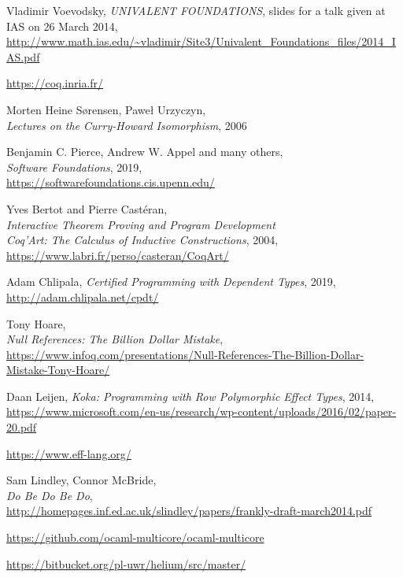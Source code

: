 \documentclass[declaration,inz,english,shortabstract]{iithesis}
\begin{document}
\begin{thebibliography}{1}
        Vladimir Voevodsky,
        \textit{UNIVALENT FOUNDATIONS},
        slides for a talk given at IAS on 26 March 2014, \\
        \url{http://www.math.ias.edu/~vladimir/Site3/Univalent_Foundations_files/2014_IAS.pdf}

        \url{https://coq.inria.fr/}

        Morten Heine Sørensen, Paweł Urzyczyn, \\
        \textit{Lectures on the Curry-Howard Isomorphism}, 2006
    
        Benjamin C. Pierce, Andrew W. Appel and many others, \\
        \textit{Software Foundations}, 2019, \\
        \url{https://softwarefoundations.cis.upenn.edu/}
    
        Yves Bertot and Pierre Castéran, \\
        \textit{Interactive Theorem Proving and Program Development \\ Coq'Art: The Calculus of Inductive Constructions}, 2004, \\
        \url{https://www.labri.fr/perso/casteran/CoqArt/}

        Adam Chlipala,
        \textit{Certified Programming with Dependent Types}, 2019,
        \url{http://adam.chlipala.net/cpdt/}

        Tony Hoare, \\
        \textit{Null References: The Billion Dollar Mistake}, \\
        \url{https://www.infoq.com/presentations/Null-References-The-Billion-Dollar-Mistake-Tony-Hoare/}
    
        Daan Leijen,
        \textit{Koka: Programming with Row Polymorphic Effect Types}, 2014, \\
        \url{https://www.microsoft.com/en-us/research/wp-content/uploads/2016/02/paper-20.pdf}

        \url{https://www.eff-lang.org/}

        Sam Lindley, Connor McBride, \\
        \textit{Do Be Do Be Do}, \\
        \url{http://homepages.inf.ed.ac.uk/slindley/papers/frankly-draft-march2014.pdf}

        \url{https://github.com/ocaml-multicore/ocaml-multicore}
        
        \url{https://bitbucket.org/pl-uwr/helium/src/master/}
\end{thebibliography}

\end{document}
